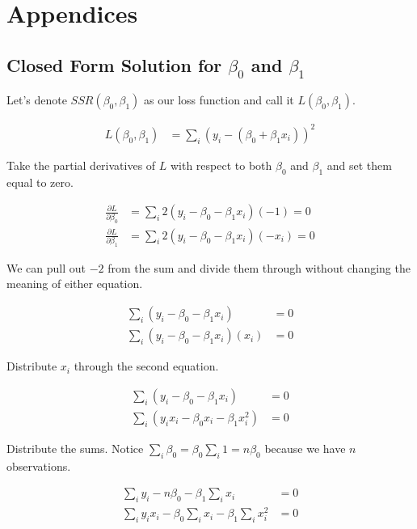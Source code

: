 \section{Appendices}

\subsection{Closed Form Solution for $\beta_0$ and $\beta_1$}

Let's denote $SSR(\beta_0, \beta_1)$ as our loss function and call it $L(\beta_0, \beta_1)$.

\begin{align}
L(\beta_0, \beta_1) &= \sum_i ( y_i -  (\beta_0 + \beta_1 x_i) )^2
\end{align}

Take the partial derivatives of $L$ with respect to both $\beta_0$ and $\beta_1$ and set them equal to zero.

\begin{align}
\frac{\partial L}{\partial \beta_0} &= \sum_i 2( y_i - \beta_0 - \beta_1 x_i )(-1) = 0 \\
\frac{\partial L}{\partial \beta_1} &= \sum_i 2( y_i - \beta_0 - \beta_1 x_i )(-x_i) = 0 
\end{align}

We can pull out $-2$ from the sum and divide them through without changing the meaning of either equation.

\begin{align}
 \sum_i ( y_i - \beta_0 - \beta_1 x_i ) &= 0 \\
 \sum_i ( y_i - \beta_0 - \beta_1 x_i )(x_i) &= 0 
\end{align}

Distribute $x_i$ through the second equation.

\begin{align}
 \sum_i ( y_i - \beta_0 - \beta_1 x_i ) &= 0 \\
 \sum_i ( y_i x_i - \beta_0 x_i - \beta_1 x_i^2 ) &= 0 
\end{align}

Distribute the sums. Notice $\sum_i \beta_0 = \beta_0 \sum_i 1 = n\beta_0$ because we have $n$ observations.

\begin{align}
 \sum_i y_i  - n \beta_0 - \beta_1 \sum_i x_i  &= 0 \\
 \sum_i y_i x_i - \beta_0 \sum_i x_i - \beta_1 \sum_i x_i^2  &= 0 
\end{align}

